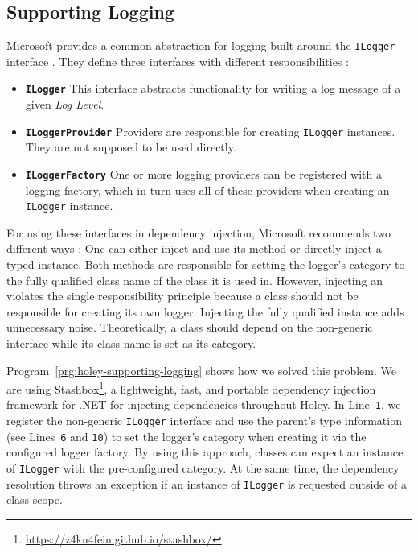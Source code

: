 \subsection{Supporting Logging}
\label{sec:holey-supporting-logging}
Microsoft provides a common abstraction for logging built around the \verb|ILogger|-interface \cite{microsoft_logging_2023}.
They define three interfaces with different responsibilities \cite{bahreini_should_2018}:
%
\begin{itemize}
    \item[1.] \textbf{\texttt{ILogger}} This interface abstracts functionality for writing a log message of a given \emph{Log Level}.
    \item[2.] \textbf{\texttt{ILoggerProvider}} Providers are responsible for creating \verb|ILogger| instances. They are not supposed to be used directly.
    \item[3.] \textbf{\texttt{ILoggerFactory}} One or more logging providers can be registered with a logging factory, which in turn uses all of these providers when creating an \verb|ILogger| instance.
\end{itemize}

For using these interfaces in dependency injection, Microsoft recommends two different ways \cite{microsoft_logging_2023}: One can either inject \texttt{} and use its \texttt{} method or directly inject a typed \texttt{} instance.
Both methods are responsible for setting the logger's category to the fully qualified class name of the class it is used in.
However, injecting an \texttt{} violates the single responsibility principle \cite{bahreini_should_2018} because a class should not be responsible for creating its own logger.
Injecting the fully qualified \texttt{} instance adds unnecessary noise.
Theoretically, a class should depend on the non-generic interface \texttt{} while its class name is set as its category.

Program~\ref{prg:holey-supporting-logging} shows how we solved this problem.
We are using Stashbox\footnote{\url{https://z4kn4fein.github.io/stashbox/}}, a lightweight, fast, and portable dependency injection framework for .NET for injecting dependencies throughout Holey.
In Line~\verb|1|, we register the non-generic \verb|ILogger| interface and use the parent's type information (see Lines~\verb|6| and \verb|10|) to set the logger's category when creating it via the configured logger factory.
By using this approach, classes can expect an instance of \verb|ILogger| with the pre-configured category.
At the same time, the dependency resolution throws an exception if an instance of \verb|ILogger| is requested outside of a class scope.

